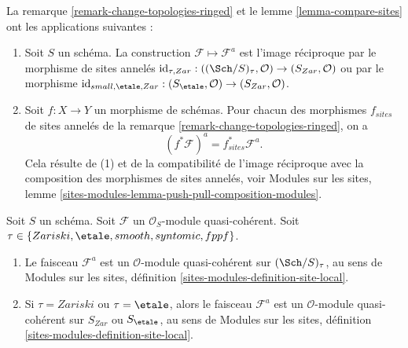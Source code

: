 \begin{remark}
\label{remark-change-topologies-ringed-sites}
La remarque \ref{remark-change-topologies-ringed}
et le
lemme \ref{lemma-compare-sites}
ont les applications suivantes :
\begin{enumerate}
\item Soit $S$ un schéma.
La construction $\mathcal{F} \mapsto \mathcal{F}^a$
est l'image réciproque par le morphisme de sites annelés
$\text{id}_{\tau, Zar} : ((\Sch/S)_\tau, \mathcal{O})
\to (S_{Zar}, \mathcal{O})$
ou par le morphisme
$\text{id}_{small, \etale, Zar} :
(S_\etale, \mathcal{O}) \to (S_{Zar}, \mathcal{O})$.
\item Soit $f : X \to Y$ un morphisme de schémas.
Pour chacun des morphismes $f_{sites}$ de sites annelés de la
remarque \ref{remark-change-topologies-ringed},
on a
$$
(f^*\mathcal{F})^a = f_{sites}^*\mathcal{F}^a.
$$
Cela résulte de (1) et de la compatibilité de l'image réciproque avec
la composition des morphismes de sites annelés, voir
Modules sur les sites,
lemme \ref{sites-modules-lemma-push-pull-composition-modules}.
\end{enumerate}
\end{remark}

\begin{lemma}
\label{lemma-quasi-coherent-gives-quasi-coherent}
Soit $S$ un schéma.
Soit $\mathcal{F}$ un $\mathcal{O}_S$-module quasi-cohérent.
Soit $\tau \in \{Zariski, \linebreak[0] \etale, \linebreak[0]
smooth, \linebreak[0] syntomic, \linebreak[0] fppf\}$.
\begin{enumerate}
\item Le faisceau $\mathcal{F}^a$ est un $\mathcal{O}$-module
quasi-cohérent sur $(\Sch/S)_\tau$, au sens de
Modules sur les sites, définition \ref{sites-modules-definition-site-local}.
\item Si $\tau = Zariski$ ou $\tau = \etale$, alors le faisceau
$\mathcal{F}^a$ est un $\mathcal{O}$-module quasi-cohérent sur
$S_{Zar}$ ou $S_\etale$, au sens de
Modules sur les sites, définition \ref{sites-modules-definition-site-local}.
\end{enumerate}
\end{lemma}

